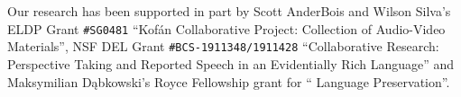 \documentclass[output=paper,colorlinks,citecolor=brown]{langscibook}
\begin{document}
Our research has been supported in part by Scott AnderBois and Wilson Silva's ELDP Grant \texttt{\#SG0481} ``Kofán Collaborative Project: Collection of Audio-Video Materials'', NSF DEL Grant \texttt{\#BCS-1911348/1911428} ``Collaborative Research: Perspective Taking and Reported Speech in an Evidentially Rich Language'' and Maksymilian Dąbkowski's Royce Fellowship grant for `` Language Preservation''.






\sloppy
\printbibliography[heading=subbibliography, notkeyword=this]
\end{document}
